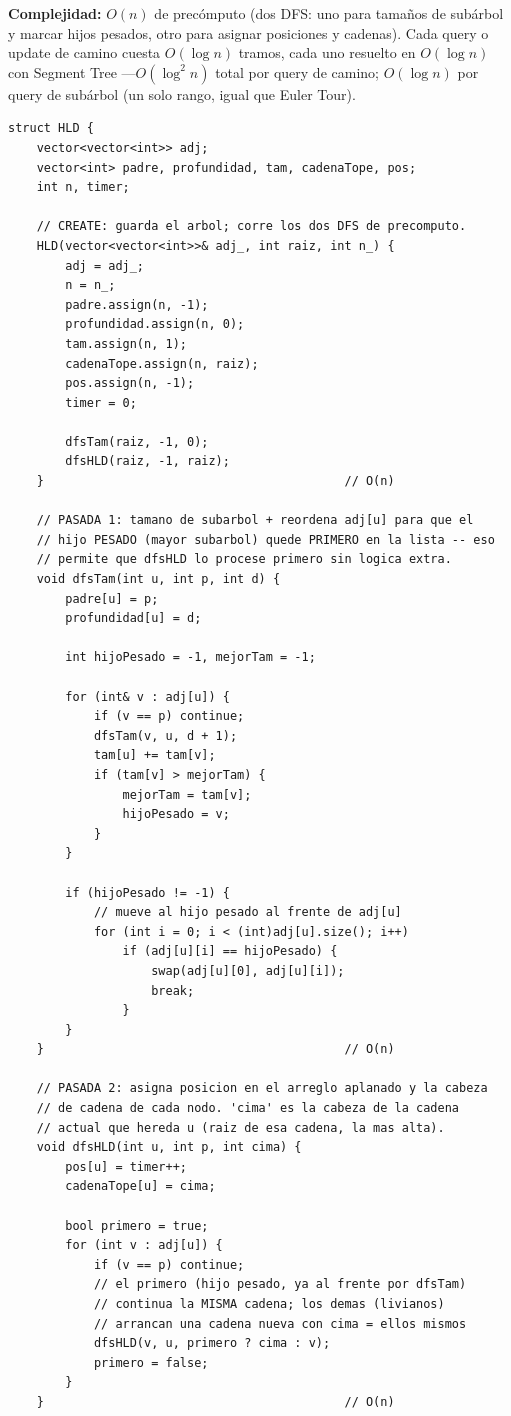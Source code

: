 \documentclass[10pt,a4paper,twocolumn]{article}
\begin{document}
\textbf{Complejidad:} $O(n)$ de precómputo (dos DFS: uno para
tamaños de subárbol y marcar hijos pesados, otro para asignar
posiciones y cadenas). Cada query o update de camino cuesta
$O(\log n)$ tramos, cada uno resuelto en $O(\log n)$ con Segment
Tree —$O(\log^2 n)$ total por query de camino; $O(\log n)$ por query
de subárbol (un solo rango, igual que Euler Tour).

\begin{lstlisting}[style=cpp]
struct HLD {
    vector<vector<int>> adj;
    vector<int> padre, profundidad, tam, cadenaTope, pos;
    int n, timer;

    // CREATE: guarda el arbol; corre los dos DFS de precomputo.
    HLD(vector<vector<int>>& adj_, int raiz, int n_) {
        adj = adj_;
        n = n_;
        padre.assign(n, -1);
        profundidad.assign(n, 0);
        tam.assign(n, 1);
        cadenaTope.assign(n, raiz);
        pos.assign(n, -1);
        timer = 0;

        dfsTam(raiz, -1, 0);
        dfsHLD(raiz, -1, raiz);
    }                                          // O(n)

    // PASADA 1: tamano de subarbol + reordena adj[u] para que el
    // hijo PESADO (mayor subarbol) quede PRIMERO en la lista -- eso
    // permite que dfsHLD lo procese primero sin logica extra.
    void dfsTam(int u, int p, int d) {
        padre[u] = p;
        profundidad[u] = d;

        int hijoPesado = -1, mejorTam = -1;

        for (int& v : adj[u]) {
            if (v == p) continue;
            dfsTam(v, u, d + 1);
            tam[u] += tam[v];
            if (tam[v] > mejorTam) {
                mejorTam = tam[v];
                hijoPesado = v;
            }
        }

        if (hijoPesado != -1) {
            // mueve al hijo pesado al frente de adj[u]
            for (int i = 0; i < (int)adj[u].size(); i++)
                if (adj[u][i] == hijoPesado) {
                    swap(adj[u][0], adj[u][i]);
                    break;
                }
        }
    }                                          // O(n)

    // PASADA 2: asigna posicion en el arreglo aplanado y la cabeza
    // de cadena de cada nodo. 'cima' es la cabeza de la cadena
    // actual que hereda u (raiz de esa cadena, la mas alta).
    void dfsHLD(int u, int p, int cima) {
        pos[u] = timer++;
        cadenaTope[u] = cima;

        bool primero = true;
        for (int v : adj[u]) {
            if (v == p) continue;
            // el primero (hijo pesado, ya al frente por dfsTam)
            // continua la MISMA cadena; los demas (livianos)
            // arrancan una cadena nueva con cima = ellos mismos
            dfsHLD(v, u, primero ? cima : v);
            primero = false;
        }
    }                                          // O(n)


\end{lstlisting}
\end{document}

